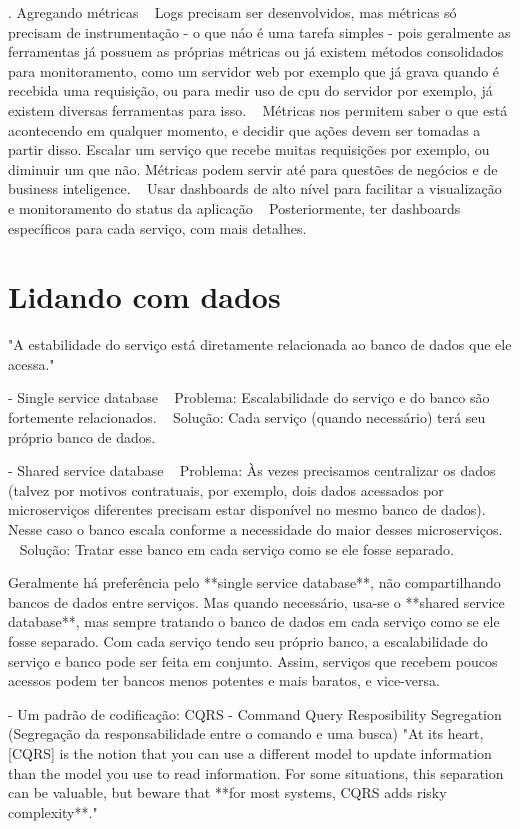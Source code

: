     . Agregando métricas
        ~ Logs precisam ser desenvolvidos, mas métricas só precisam de instrumentação - o que náo é uma tarefa simples - pois geralmente as ferramentas já possuem as próprias métricas ou já existem métodos consolidados para monitoramento, como um servidor web por exemplo que já grava quando é recebida uma requisição, ou para medir uso de cpu do servidor por exemplo, já existem diversas ferramentas para isso.
        ~ Métricas nos permitem saber o que está acontecendo em qualquer momento, e decidir que ações devem ser tomadas a partir disso. Escalar um serviço que recebe muitas requisições por exemplo, ou diminuir um que não. Métricas podem servir até para questões de negócios e de business inteligence. 
        ~ Usar dashboards de alto nível para facilitar a visualização e monitoramento do status da aplicação
        ~ Posteriormente, ter dashboards específicos para cada serviço, com mais detalhes.

\section{Lidando com dados}

"A estabilidade do serviço está diretamente relacionada ao banco de dados que ele acessa."

        - Single service database
            ~ Problema: Escalabilidade do serviço e do banco são fortemente relacionados.
            ~ Solução: Cada serviço (quando necessário) terá seu próprio banco de dados.

        - Shared service database
            ~ Problema: Às vezes precisamos centralizar os dados (talvez por motivos contratuais, por exemplo, dois dados acessados por microserviços diferentes precisam estar disponível no mesmo banco de dados). Nesse caso o banco escala conforme a necessidade do maior desses microserviços.
            ~ Solução: Tratar esse banco em cada serviço como se ele fosse separado.

        Geralmente há preferência pelo **single service database**, não compartilhando bancos de dados entre serviços. Mas quando necessário, usa-se o **shared service database**, mas sempre tratando o banco de dados em cada serviço como se ele fosse separado.
        Com cada serviço tendo seu próprio banco, a escalabilidade do serviço e banco pode ser feita em conjunto. Assim, serviços que recebem poucos acessos podem ter bancos menos potentes e mais baratos, e vice-versa.

        - Um padrão de codificação: CQRS - Command Query Resposibility Segregation (Segregação da responsabilidade entre o comando e uma busca)
            "At its heart, [CQRS] is the notion that you can use a different model to update information than the model you use to read information. For some situations, this separation can be valuable, but beware that **for most systems, CQRS adds risky complexity**."

